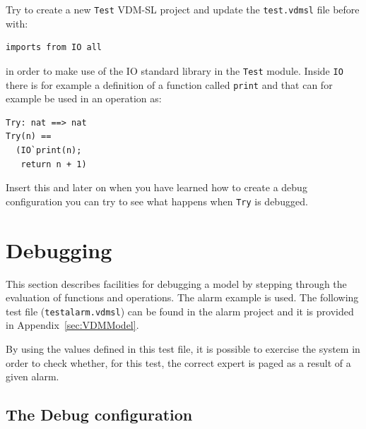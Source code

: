 {\begin{myexercise}\label{ex:tb-error}
Try to create a new \texttt{Test} VDM-SL project and update the
\texttt{test.vdmsl} file before {\bf{}} with:
\begin{lstlisting}
imports from IO all
\end{lstlisting}
in order to make use of the IO standard library in the \texttt{Test}
module. Inside \texttt{IO} there is for example a definition of a
function called \texttt{print} and that can for example be used in an
operation as:
\begin{lstlisting}
Try: nat ==> nat
Try(n) ==
  (IO`print(n);
   return n + 1)
\end{lstlisting}
Insert this and later on when you have learned how to create a debug
configuration you can try to see what happens when \texttt{Try} is
debugged. 
\end{myexercise}
 
\section{Debugging}\label{sec:debugging}

This section describes facilities for debugging a model by stepping
through the evaluation of functions and operations. The alarm example
is used. The following test file (\texttt{testalarm.vdmsl}) can be
found in the alarm project and it is provided in
Appendix~\ref{sec:VDMModel}. 

\lstset{language=VDM-SL}
%

By using the values defined in this test file, it is possible to
exercise the system in order to check whether, for this test, the
correct expert is paged as a result of a given alarm.


\subsection{The Debug configuration}

}
